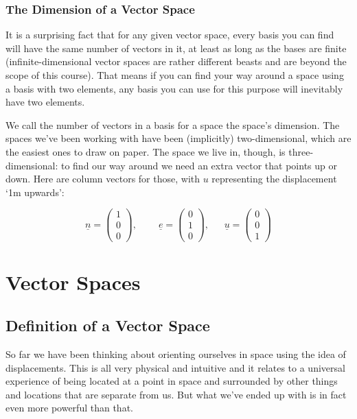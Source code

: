 \documentclass[oneside,english]{amsbook}
\numberwithin{section}{chapter}
\theoremstyle{plain}
\theoremstyle{definition}
\begin{document}
\subsubsection{The Dimension of a Vector Space}

It is a surprising fact that for any given vector space, every basis you
can find will have the same number of vectors in it, at least as long as
the bases are finite (infinite-dimensional vector spaces are rather
different beasts and are beyond the scope of this course). That means if
you can find your way around a space using a basis with two elements,
any basis you can use for this purpose will inevitably have two
elements.

We call the number of vectors in a basis for a space the space's
dimension. The spaces we've been working with have been (implicitly)
two-dimensional, which are the easiest ones to draw on paper. The space
we live in, though, is three-dimensional: to find our way around we need
an extra vector that points up or down. Here are column vectors for
those, with $u$ representing the displacement `1m upwards':

\[\underline{n} = \begin{pmatrix}
	1 \\
	0 \\
	0
\end{pmatrix},\ \ \ \ \ \ \ \ \ \ \underline{e} = \begin{pmatrix}
	0 \\
	1 \\
	0
\end{pmatrix},\ \ \ \ \ \ \ \underline{u} = \begin{pmatrix}
	0 \\
	0 \\
	1
\end{pmatrix}\]

\section{Vector Spaces}

\subsection{Definition of a Vector Space}

So far we have been thinking about orienting ourselves in space using
the idea of displacements. This is all very physical and intuitive and
it relates to a universal experience of being located at a point in
space and surrounded by other things and locations that are separate
from us. But what we've ended up with is in fact even more powerful than
that.
\end{document}
